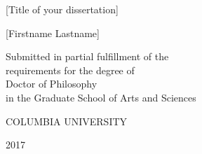 \thispagestyle{empty} %
\setcounter{page}{0} %
\begin{center}
  \SingleSpace

  \vspace*{2in}
  \Large
  [Title of your dissertation]

  \vspace*{0.3 in} %
  \normalsize
  [Firstname Lastname]

  \vspace{3.5in}

  Submitted in partial fulfillment of the\\
  requirements for the degree of\\
  Doctor of Philosophy\\
  in the Graduate School of Arts and Sciences

  \vfill

  COLUMBIA UNIVERSITY

  \bigskip %

  2017
\end{center}
